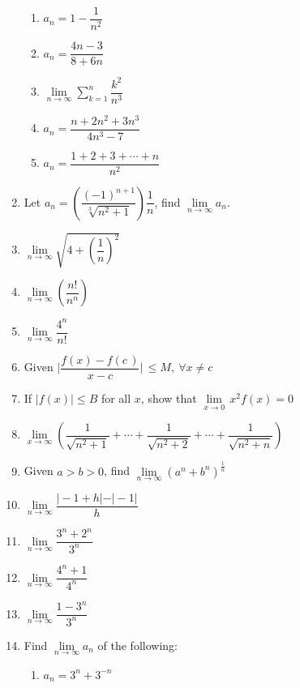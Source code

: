 \documentclass{report}
\begin{document}
\begin{multicols}{2}
\begin{enumerate}
                  \begin{enumerate}
                        \item $a_{n}=1-{\dfrac{1}{n^{2}}}$
                        \item $a_{n}={\dfrac{4n-3}{8+6n}}$
                        \item $\lim\limits_{n \to \infty}\sum\limits_{k=1}^{n}\dfrac{k^2}{n^3}$
                        \item $a_{n}=\dfrac{n+2n^{2}+3n^{3}}{4n^{3}-7}$
                        \item $a_{n}={\dfrac{1+2+3+\cdots+n}{n^{2}}}$
                  \end{enumerate}
            \item Let $a_{n}={\left(\dfrac{{(-1)}^{n+1}}{\sqrt[3]{n^{2}+1}}\right)}\dfrac{1}{n}$,
                  find $\lim\limits_{n \to \infty}a_n$.
            \item $\lim\limits_{n\to\infty}\sqrt{4+{\left({\dfrac{1}{n}}\right)}^{2}}$
            \item $\lim\limits_{n\to\infty}{\left(\dfrac{n!}{n^{n}}\right)}$
            \item $\lim\limits_{n\to\infty}{\dfrac{4^{n}}{n!}}$
            \item Given $\vert\dfrac{f(x)-f(c\,)}{x-c}\vert\,\leq M,\ \forall x\not=c$
            \item If $\vert f(x)\vert \le B$ for all $x$, show that
                  $\lim\limits_{x\to0}\,x^{2}f(x)=0$
            \item $\lim\limits_{x\to\infty}\left(\dfrac{1}{\sqrt{n^{2}+1}}+\cdots+\dfrac{1}{\sqrt{n^{2}+2}}+\cdots+\dfrac{1}{\sqrt{n^{2}+n}}\right)$
            \item Given $a > b > 0$, find
                  $\lim\limits_{n\to\infty}{\left(a^{n}+b^{n}\right)}^{\frac{1}{n}}$
            \item $\lim\limits_{n\to\infty}\dfrac{\vert-1+h\vert-\vert-1\vert}{h}$
            \item $\lim\limits_{n\to\infty}\dfrac{3^n + 2^n}{3^n}$
            \item $\lim\limits_{n\to\infty}\dfrac{4^{n}+1}{4^{n}}$
            \item $\lim\limits_{n\to\infty}{\dfrac{1-3^{n}}{3^{n}}}$
            \item Find $\lim\limits_{n\to\infty}a_n$ of the following:
                  \begin{enumerate}
                        \item $a_n = 3^{n}+3^{-n}$

\end{enumerate}
\end{enumerate}
\end{multicols}
\end{document}
